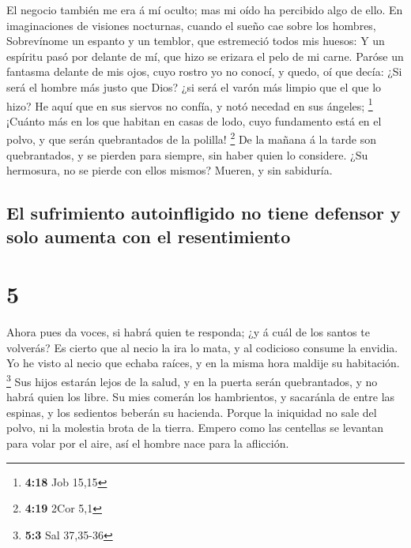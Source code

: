  El negocio también me era á mí oculto; mas mi oído ha
percibido algo de ello.  En imaginaciones de visiones
nocturnas, cuando el sueño cae sobre los hombres, 
Sobrevínome un espanto y un temblor, que estremeció todos mis huesos:
 Y un espíritu pasó por delante de mí, que hizo se
erizara el pelo de mi carne.  Paróse un fantasma delante
de mis ojos, cuyo rostro yo no conocí, y quedo, oí que decía:
 ¿Si será el hombre más justo que Dios? ¿si será el varón
más limpio que el que lo hizo?  He aquí que en sus
siervos no confía, y notó necedad en sus ángeles; \footnote{\textbf{4:18}
  Job 15,15}  ¡Cuánto más en los que habitan en casas de
lodo, cuyo fundamento está en el polvo, y que serán quebrantados de la
polilla! \footnote{\textbf{4:19} 2Cor 5,1}  De la mañana
á la tarde son quebrantados, y se pierden para siempre, sin haber quien
lo considere.  ¿Su hermosura, no se pierde con ellos
mismos? Mueren, y sin sabiduría.

\hypertarget{el-sufrimiento-autoinfligido-no-tiene-defensor-y-solo-aumenta-con-el-resentimiento}{%
\subsection{El sufrimiento autoinfligido no tiene defensor y solo
aumenta con el
resentimiento}\label{el-sufrimiento-autoinfligido-no-tiene-defensor-y-solo-aumenta-con-el-resentimiento}}

\hypertarget{section-4}{%
\section{5}\label{section-4}}

 Ahora pues da voces, si habrá quien te responda; ¿y á
cuál de los santos te volverás?  Es cierto que al necio la
ira lo mata, y al codicioso consume la envidia.  Yo he
visto al necio que echaba raíces, y en la misma hora maldije su
habitación. \footnote{\textbf{5:3} Sal 37,35-36}  Sus
hijos estarán lejos de la salud, y en la puerta serán quebrantados, y no
habrá quien los libre.  Su mies comerán los hambrientos, y
sacaránla de entre las espinas, y los sedientos beberán su hacienda.
 Porque la iniquidad no sale del polvo, ni la molestia
brota de la tierra.  Empero como las centellas se levantan
para volar por el aire, así el hombre nace para la aflicción.

